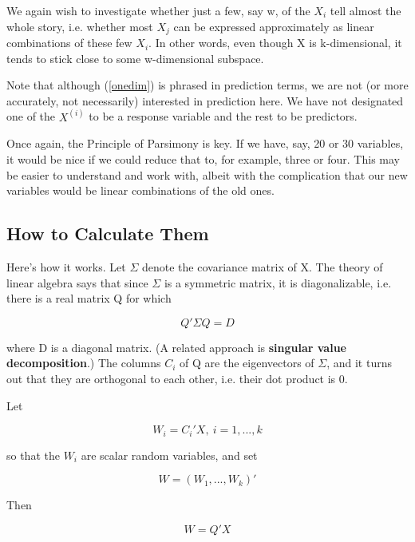 We again wish to investigate whether just a few, say w, of the $X_i$ tell
almost the whole story, i.e. whether most $X_j$ can be expressed
approximately as linear combinations of these few $X_i$.  In other
words, even though X is k-dimensional, it tends to stick close to some
w-dimensional subspace.

Note that although (\ref{onedim}) is phrased in prediction terms, we are
not (or more accurately, not necessarily) interested in prediction here.
We have not designated one of the $X^{(i)}$ to be a response variable
and the rest to be predictors.

Once again, the Principle of Parsimony is key.  If we have, say, 20 or
30 variables, it would be nice if we could reduce that to, for example,
three or four.  This may be easier to understand and work with, albeit
with the complication that our new variables would be linear
combinations of the old ones.

\subsection{How to Calculate Them}

Here's how it works.  Let $\Sigma$ denote the covariance matrix of X.
The theory of linear algebra says that since $\Sigma$ is a symmetric
matrix, it is diagonalizable, i.e. there is a real matrix Q for which 

\begin{equation}
\label{qsigq}
Q' \Sigma Q = D
\end{equation}

where D is a diagonal matrix.  (A related approach is {\bf singular
value decomposition}.) The columns $C_i$ of Q are the eigenvectors of
$\Sigma$, and it turns out that they are orthogonal to each other, i.e.
their dot product is 0.

Let 

\begin{equation}
W_i = C_i'X, ~ i = 1,...,k
\end{equation}

so that the $W_i$ are scalar random variables, and set 

\begin{equation}
W = (W_1,...,W_k)'
\end{equation}

Then

\begin{equation}
W = Q' X
\end{equation}

